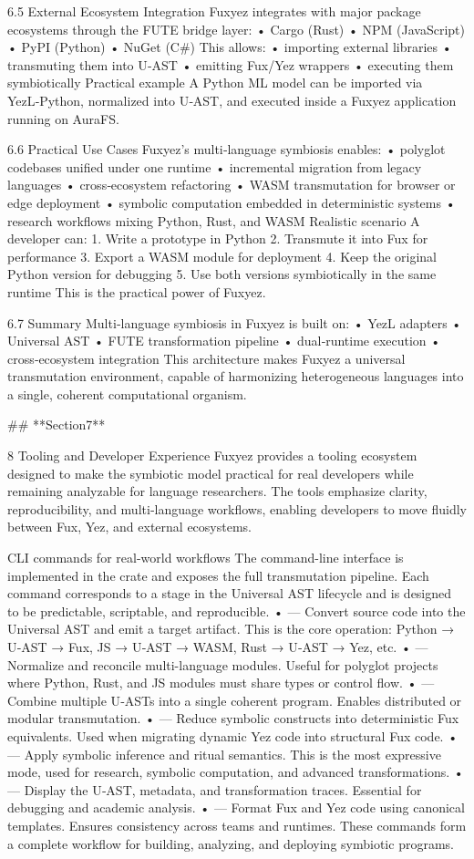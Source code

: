 6.5 External Ecosystem Integration
Fuxyez integrates with major package ecosystems through the FUTE bridge layer:
• 	Cargo (Rust)
• 	NPM (JavaScript)
• 	PyPI (Python)
• 	NuGet (C#)
This allows:
• 	importing external libraries
• 	transmuting them into U‑AST
• 	emitting Fux/Yez wrappers
• 	executing them symbiotically
Practical example
A Python ML model can be imported via YezL‑Python, normalized into U‑AST, and executed inside a Fuxyez application running on AuraFS.

6.6 Practical Use Cases
Fuxyez’s multi‑language symbiosis enables:
• 	polyglot codebases unified under one runtime
• 	incremental migration from legacy languages
• 	cross‑ecosystem refactoring
• 	WASM transmutation for browser or edge deployment
• 	symbolic computation embedded in deterministic systems
• 	research workflows mixing Python, Rust, and WASM
Realistic scenario
A developer can:
1. 	Write a prototype in Python
2. 	Transmute it into Fux for performance
3. 	Export a WASM module for deployment
4. 	Keep the original Python version for debugging
5. 	Use both versions symbiotically in the same runtime
This is the practical power of Fuxyez.

6.7 Summary
Multi‑language symbiosis in Fuxyez is built on:
• 	YezL adapters
• 	Universal AST
• 	FUTE transformation pipeline
• 	dual‑runtime execution
• 	cross‑ecosystem integration
This architecture makes Fuxyez a universal transmutation environment, capable of harmonizing heterogeneous languages into a single, coherent computational organism.

## **Section7**

8 Tooling and Developer Experience
Fuxyez provides a tooling ecosystem designed to make the symbiotic model practical for real developers while remaining analyzable for language researchers. The tools emphasize clarity, reproducibility, and multi‑language workflows, enabling developers to move fluidly between Fux, Yez, and external ecosystems.

CLI commands for real-world workflows
The command-line interface is implemented in the  crate and exposes the full transmutation pipeline. Each command corresponds to a stage in the Universal AST lifecycle and is designed to be predictable, scriptable, and reproducible.
• 	 — Convert source code into the Universal AST and emit a target artifact.
This is the core operation: Python → U‑AST → Fux, JS → U‑AST → WASM, Rust → U‑AST → Yez, etc.
• 	 — Normalize and reconcile multi-language modules.
Useful for polyglot projects where Python, Rust, and JS modules must share types or control flow.
• 	 — Combine multiple U‑ASTs into a single coherent program.
Enables distributed or modular transmutation.
• 	 — Reduce symbolic constructs into deterministic Fux equivalents.
Used when migrating dynamic Yez code into structural Fux code.
• 	 — Apply symbolic inference and ritual semantics.
This is the most expressive mode, used for research, symbolic computation, and advanced transformations.
• 	 — Display the U‑AST, metadata, and transformation traces.
Essential for debugging and academic analysis.
• 	 — Format Fux and Yez code using canonical templates.
Ensures consistency across teams and runtimes.
These commands form a complete workflow for building, analyzing, and deploying symbiotic programs.

